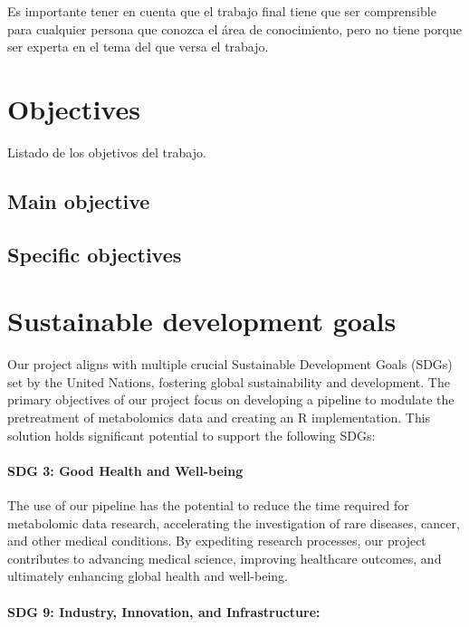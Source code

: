 \documentclass[ENG, BIB]{TFUOC}%
\begin{document}
Es importante tener en cuenta que el trabajo final tiene que ser comprensible para cualquier persona que conozca el área de conocimiento, pero no tiene porque ser experta en el tema del que versa el trabajo.


\chapter{Objectives}

Listado de los objetivos del trabajo.

\section{Main objective}

\section{Specific objectives}


\chapter{Sustainable development goals}
\label{s:etic}

 Our project aligns with multiple crucial Sustainable Development Goals (SDGs) set by the United Nations, fostering global sustainability and development. The primary objectives of our project focus on developing a pipeline to modulate the pretreatment of metabolomics data and creating an R implementation. This solution holds significant potential to support the following SDGs:  
 
\subsubsection{SDG 3: Good Health and Well-being} 
 
The use of our pipeline has the potential to reduce the time required for metabolomic data research, accelerating the investigation of rare diseases, cancer, and other medical conditions. By expediting research processes, our project contributes to advancing medical science, improving healthcare outcomes, and ultimately enhancing global health and well-being.
 
\subsubsection{SDG 9: Industry, Innovation, and Infrastructure:} 
 
\end{document}
